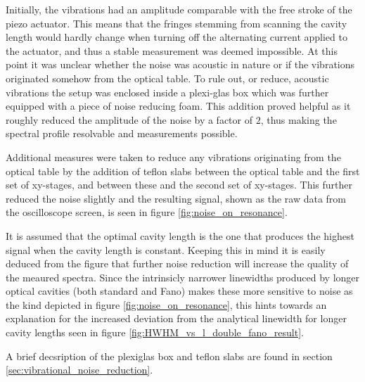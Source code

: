 Initially, the vibrations had an amplitude comparable with the free stroke of the piezo actuator. This means that the fringes stemming from scanning the cavity length would hardly change when turning off the alternating current applied to the actuator, and thus a stable measurement was deemed impossible. At this point it was unclear whether the noise was acoustic in nature or if the vibrations originated somehow from the optical table. To rule out, or reduce, acoustic vibrations the setup was enclosed inside a plexi-glas box which was further equipped with a piece of noise reducing foam. This addition proved helpful as it roughly reduced the amplitude of the noise by a factor of $2$, thus making the spectral profile resolvable and measurements possible. 

Additional measures were taken to reduce any vibrations originating from the optical table by the addition of teflon slabs between the optical table and the first set of xy-stages, and between these and the second set of xy-stages. This further reduced the noise slightly and the resulting signal, shown as the raw data from the oscilloscope screen, is seen in figure \ref{fig:noise_on_resonance}.

It is assumed that the optimal cavity length is the one that produces the highest signal when the cavity length is constant. Keeping this in mind it is easily deduced from the figure that further noise reduction will increase the quality of the meaured spectra. Since the intrinsicly narrower linewidths produced by longer optical cavities (both standard and Fano) makes these more sensitive to noise as the kind depicted in figure \ref{fig:noise_on_resonance}, this hints towards an explanation for the increased deviation from the analytical linewidth for longer cavity lengths seen in figure \ref{fig:HWHM_vs_l_double_fano_result}.

A brief decsription of the plexiglas box and teflon slabs are found in section \ref{sec:vibrational_noise_reduction}.

